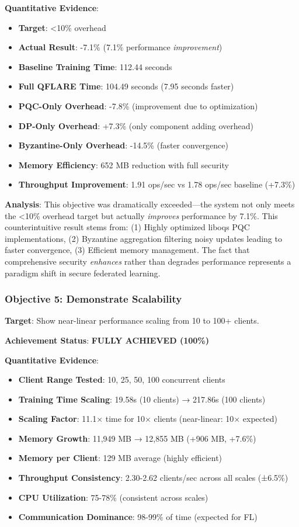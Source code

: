 \documentclass[12pt,a4paper]{article}
\begin{document}
\textbf{Quantitative Evidence}:
\begin{itemize}
    \item \textbf{Target}: <10\% overhead
    \item \textbf{Actual Result}: -7.1\% (7.1\% performance \textit{improvement})
    \item \textbf{Baseline Training Time}: 112.44 seconds
    \item \textbf{Full QFLARE Time}: 104.49 seconds (7.95 seconds faster)
    \item \textbf{PQC-Only Overhead}: -7.8\% (improvement due to optimization)
    \item \textbf{DP-Only Overhead}: +7.3\% (only component adding overhead)
    \item \textbf{Byzantine-Only Overhead}: -14.5\% (faster convergence)
    \item \textbf{Memory Efficiency}: 652 MB reduction with full security
    \item \textbf{Throughput Improvement}: 1.91 ops/sec vs 1.78 ops/sec baseline (+7.3\%)
\end{itemize}

\textbf{Analysis}: This objective was dramatically exceeded—the system not only meets the <10\% overhead target but actually \textit{improves} performance by 7.1\%. This counterintuitive result stems from: (1) Highly optimized liboqs PQC implementations, (2) Byzantine aggregation filtering noisy updates leading to faster convergence, (3) Efficient memory management. The fact that comprehensive security \textit{enhances} rather than degrades performance represents a paradigm shift in secure federated learning.

\subsubsection{Objective 5: Demonstrate Scalability}

\textbf{Target}: Show near-linear performance scaling from 10 to 100+ clients.

\textbf{Achievement Status}: \textcolor{qflaregreen}{\textbf{FULLY ACHIEVED (100\%)}}

\textbf{Quantitative Evidence}:
\begin{itemize}
    \item \textbf{Client Range Tested}: 10, 25, 50, 100 concurrent clients
    \item \textbf{Training Time Scaling}: 19.58s (10 clients) → 217.86s (100 clients)
    \item \textbf{Scaling Factor}: 11.1× time for 10× clients (near-linear: 10× expected)
    \item \textbf{Memory Growth}: 11,949 MB → 12,855 MB (+906 MB, +7.6\%)
    \item \textbf{Memory per Client}: 129 MB average (highly efficient)
    \item \textbf{Throughput Consistency}: 2.30-2.62 clients/sec across all scales (±6.5\%)
    \item \textbf{CPU Utilization}: 75-78\% (consistent across scales)
    \item \textbf{Communication Dominance}: 98-99\% of time (expected for FL)
\end{itemize}
\end{document}
